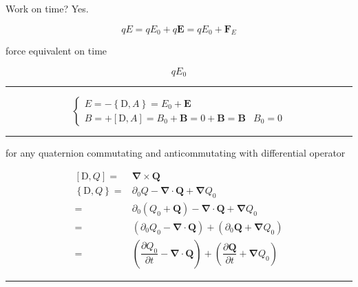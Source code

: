 \documentclass[
]{book}
\theoremstyle{definition}
\theoremstyle{definition}
\theoremstyle{definition}
\theoremstyle{definition}
\theoremstyle{remark}
\begin{document}
Work on time? Yes.

\[
qE=qE_{{\scriptscriptstyle 0}}+q\boldsymbol{E}=qE_{{\scriptscriptstyle 0}}+\boldsymbol{F}_{E}
\]

force equivalent on time

\[
qE_{{\scriptscriptstyle 0}}
\]

\begin{center}\rule{0.5\linewidth}{0.5pt}\end{center}

\[
\begin{cases}
E=-\left\{ \mathrm{D},A\right\} =E_{{\scriptscriptstyle 0}}+\boldsymbol{E}\\
B=+\left[\mathrm{D},A\right]=B_{{\scriptscriptstyle 0}}+\boldsymbol{B}=0+\boldsymbol{B}=\boldsymbol{B} & B_{{\scriptscriptstyle 0}}=0
\end{cases}
\]

\begin{center}\rule{0.5\linewidth}{0.5pt}\end{center}

for any quaternion commutating and anticommutating with differential operator

\[
\begin{aligned}
\left[\mathrm{D},Q\right]= & \boldsymbol{\nabla}\times\boldsymbol{Q}\\
\left\{ \mathrm{D},Q\right\} = & \partial_{{\scriptscriptstyle 0}}Q-\boldsymbol{\nabla}\cdot\boldsymbol{Q}+\boldsymbol{\nabla}Q_{{\scriptscriptstyle 0}}\\
= & \partial_{{\scriptscriptstyle 0}}\left(Q_{{\scriptscriptstyle 0}}+\boldsymbol{Q}\right)-\boldsymbol{\nabla}\cdot\boldsymbol{Q}+\boldsymbol{\nabla}Q_{{\scriptscriptstyle 0}}\\
= & \left(\partial_{{\scriptscriptstyle 0}}Q_{{\scriptscriptstyle 0}}-\boldsymbol{\nabla}\cdot\boldsymbol{Q}\right)+\left(\partial_{{\scriptscriptstyle 0}}\boldsymbol{Q}+\boldsymbol{\nabla}Q_{{\scriptscriptstyle 0}}\right)\\
= & \left(\dfrac{\partial Q_{{\scriptscriptstyle 0}}}{\partial t}-\boldsymbol{\nabla}\cdot\boldsymbol{Q}\right)+\left(\dfrac{\partial\boldsymbol{Q}}{\partial t}+\boldsymbol{\nabla}Q_{{\scriptscriptstyle 0}}\right)
\end{aligned}
\]

\begin{center}\rule{0.5\linewidth}{0.5pt}\end{center}
\end{document}
